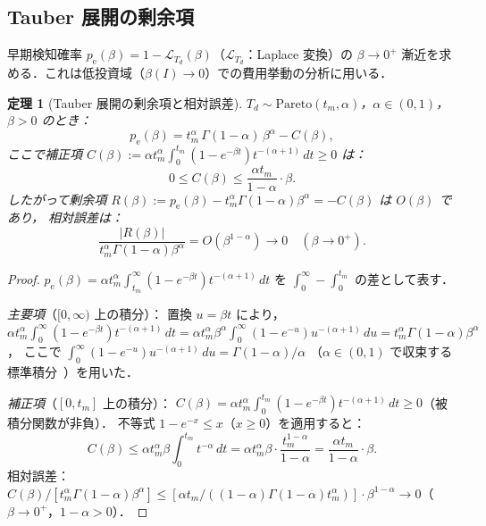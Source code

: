 \documentclass[12pt,a4paper]{article}
\theoremstyle{plain}
\newtheorem{theorem}{定理}[section]
\theoremstyle{definition}
\theoremstyle{remark}
\newcommand{\calL}{\mathcal{L}}
\newcommand{\pe}{p_{\mathrm{e}}}
\newcommand{\betaI}{\beta(I)}
\begin{document}
\subsection{Tauber 展開の剰余項}

早期検知確率 $\pe(\beta)=1-\calL_{T_d}(\beta)$（$\calL_{T_d}$：Laplace 変換）の
$\beta\to0^+$ 漸近を求める．これは低投資域（$\betaI\to0$）での費用挙動の分析に用いる．

\begin{theorem}[Tauber 展開の剰余項と相対誤差]\label{thm:remainder}
$T_d\sim\mathrm{Pareto}(t_m,\alpha)$，$\alpha\in(0,1)$，$\beta>0$ のとき：
\begin{equation}\label{eq:pe_tauber}
\pe(\beta)=t_m^\alpha\,\Gamma(1-\alpha)\,\beta^\alpha - C(\beta),
\end{equation}
ここで補正項 $C(\beta):=\alpha t_m^\alpha\int_0^{t_m}(1-e^{-\beta t})t^{-(\alpha+1)}\,dt\ge0$ は：
\begin{equation}\label{eq:C_bound}
0\le C(\beta)\le\frac{\alpha t_m}{1-\alpha}\cdot\beta.
\end{equation}
したがって剰余項 $R(\beta):=\pe(\beta)-t_m^\alpha\Gamma(1-\alpha)\beta^\alpha=-C(\beta)$ は $O(\beta)$ であり，
相対誤差は：
\[
\frac{|R(\beta)|}{t_m^\alpha\Gamma(1-\alpha)\beta^\alpha}
=O(\beta^{1-\alpha})\to0\quad(\beta\to0^+).
\]
\end{theorem}

\begin{proof}
$\pe(\beta)=\alpha t_m^\alpha\int_{t_m}^\infty(1-e^{-\beta t})t^{-(\alpha+1)}\,dt$
を $\int_0^\infty-\int_0^{t_m}$ の差として表す．

\emph{主要項}（$[0,\infty)$ 上の積分）：
置換 $u=\beta t$ により，
$\alpha t_m^\alpha\int_0^\infty(1-e^{-\beta t})t^{-(\alpha+1)}\,dt
=\alpha t_m^\alpha\beta^\alpha\int_0^\infty(1-e^{-u})u^{-(\alpha+1)}\,du
=t_m^\alpha\Gamma(1-\alpha)\beta^\alpha$，
ここで $\int_0^\infty(1-e^{-u})u^{-(\alpha+1)}\,du=\Gamma(1-\alpha)/\alpha$
（$\alpha\in(0,1)$ で収束する標準積分~\cite{feller1971}）を用いた．

\emph{補正項}（$[0,t_m]$ 上の積分）：
$C(\beta)=\alpha t_m^\alpha\int_0^{t_m}(1-e^{-\beta t})t^{-(\alpha+1)}\,dt\ge0$（被積分関数が非負）．
不等式 $1-e^{-x}\le x$（$x\ge0$）を適用すると：
\[
C(\beta)\le\alpha t_m^\alpha\beta\int_0^{t_m}t^{-\alpha}\,dt
=\alpha t_m^\alpha\beta\cdot\frac{t_m^{1-\alpha}}{1-\alpha}
=\frac{\alpha t_m}{1-\alpha}\cdot\beta.
\]
相対誤差：$C(\beta)/[t_m^\alpha\Gamma(1-\alpha)\beta^\alpha]
\le[\alpha t_m/((1-\alpha)\Gamma(1-\alpha)t_m^\alpha)]\cdot\beta^{1-\alpha}\to0$（$\beta\to0^+$，$1-\alpha>0$）．
\end{proof}
\end{document}
